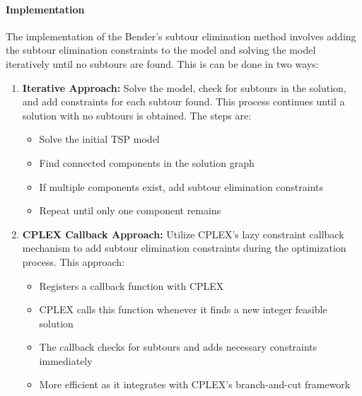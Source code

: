 \documentclass{article}
\begin{document}
\paragraph{Implementation}
The implementation of the Bender's subtour elimination method involves adding the subtour elimination constraints to the model and solving the model iteratively until no subtours are found.
This is can be done in two ways:
\begin{enumerate}
    \item \textbf{Iterative Approach:} Solve the model, check for subtours in the solution, and add constraints for each subtour found. This process continues until a solution with no subtours is obtained. The steps are:
    \begin{itemize}
        \item Solve the initial TSP model
        \item Find connected components in the solution graph
        \item If multiple components exist, add subtour elimination constraints
        \item Repeat until only one component remains
    \end{itemize}
    
    \item \textbf{CPLEX Callback Approach:} Utilize CPLEX's lazy constraint callback mechanism to add subtour elimination constraints during the optimization process. This approach:
    \begin{itemize}
        \item Registers a callback function with CPLEX
        \item CPLEX calls this function whenever it finds a new integer feasible solution
        \item The callback checks for subtours and adds necessary constraints immediately
        \item More efficient as it integrates with CPLEX's branch-and-cut framework
    \end{itemize}
\end{enumerate}
\end{document}
